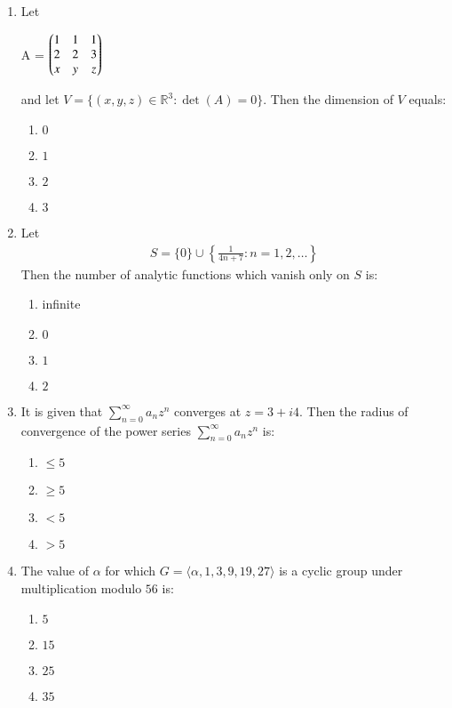 \documentclass[journal]{IEEEtran}
\numberwithin{equation}{enumi}
\numberwithin{figure}{enumi}
\begin{document}
\begin{enumerate}
\item Let             \hfill{}

A = $\begin{pmatrix}
1 & 1 & 1 \\
2 & 2 & 3 \\
x & y & z\end{pmatrix}$

and let $V = \{(x, y, z) \in \mathbb{R}^3 : \det(A) = 0\}$. Then the dimension of $V$ equals:

\begin{multicols}{4}
\begin{enumerate}
    \item $0$
    \item $1$
    \item $2$
    \item $3$
\end{enumerate}
\end{multicols}


 
\item Let  \hfill{}
\begin{align*}
 S = \{0\} \cup \left\{ \frac{1}{4n + 7} : n = 1, 2, \ldots \right\}   
\end{align*} 
Then the number of analytic functions which vanish only on $S$ is:   
\begin{multicols}{4}
\begin{enumerate}
    \item infinite
    \item $0$
    \item $1$
    \item $2$
\end{enumerate}
\end{multicols}
 

\item It is given that $\sum_{n=0}^\infty a_n z^n$ converges at $z = 3 + i4$. Then the radius of convergence of the power series $\sum_{n=0}^\infty a_n z^n$ is:   \hfill{}
\begin{multicols}{4}
\begin{enumerate}
    \item $\leq 5 $
    \item $\geq 5$
    \item $< 5$
    \item $> 5$
\end{enumerate}
\end{multicols}


\item The value of $\alpha$ for which $G = \langle \alpha, 1, 3, 9, 19, 27 \rangle$ is a cyclic group under multiplication modulo $56$ is:      \hfill{}
\begin{multicols}{4}
\begin{enumerate}
    \item $5 $
    \item $15$
    \item $25$
    \item $35$
\end{enumerate}
\end{multicols}




\end{enumerate}
\end{document}
